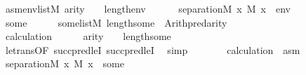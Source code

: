 \begin{isabellebody}
\ asm{\isacharcolon}{\kern0pt}{\isachardoublequoteopen}{\isasymforall}env{\isasymin}list{\isacharparenleft}{\kern0pt}M{\isacharparenright}{\kern0pt}{\isachardot}{\kern0pt}\ arity{\isacharparenleft}{\kern0pt}{\isasymphi}{\isacharparenright}{\kern0pt}\ {\isasymle}\ {}\ {\isacharhash}{\kern0pt}{\isacharplus}{\kern0pt}\ length{\isacharparenleft}{\kern0pt}env{\isacharparenright}{\kern0pt}\ {\isasymlongrightarrow}\ \isanewline
\ \ \ \ separation{\isacharparenleft}{\kern0pt}{\isacharhash}{\kern0pt}{\isacharhash}{\kern0pt}M{\isacharcomma}{\kern0pt}\ {\isasymlambda}x{\isachardot}{\kern0pt}\ M{\isacharcomma}{\kern0pt}\ {\isacharbrackleft}{\kern0pt}x{\isacharbrackright}{\kern0pt}\ {\isacharat}{\kern0pt}\ env\ {\isasymTurnstile}\ {\isasymphi}{\isacharparenright}{\kern0pt}{\isachardoublequoteclose}\isanewline
\ \ \isacommand{{\isacharbraceleft}{\kern0pt}}\isamarkupfalse%
\isanewline
\ \ \ \ \isamarkupfalse%
\ some\isanewline
\ \ \ \ \isamarkupfalse%
\ {\isachardoublequoteopen}some{\isasymin}list{\isacharparenleft}{\kern0pt}M{\isacharparenright}{\kern0pt}{\isachardoublequoteclose}\ {\isachardoublequoteopen}length{\isacharparenleft}{\kern0pt}some{\isacharparenright}{\kern0pt}\ {\isacharequal}{\kern0pt}\ Arith{\isachardot}{\kern0pt}pred{\isacharparenleft}{\kern0pt}arity{\isacharparenleft}{\kern0pt}{\isasymphi}{\isacharparenright}{\kern0pt}{\isacharparenright}{\kern0pt}{\isachardoublequoteclose}\isanewline
\ \ \ \ \isamarkupfalse%
\isanewline
\ \ \ \ \isamarkupfalse%
\ {\isacartoucheopen}{\isasymphi}{\isasymin}{\isacharunderscore}{\kern0pt}{\isacartoucheclose}\isanewline
\ \ \ \ \isamarkupfalse%
\ \isamarkupfalse%
\ calculation\isanewline
\ \ \ \ \isamarkupfalse%
\ {\isachardoublequoteopen}arity{\isacharparenleft}{\kern0pt}{\isasymphi}{\isacharparenright}{\kern0pt}\ {\isasymle}\ {}\ {\isacharhash}{\kern0pt}{\isacharplus}{\kern0pt}\ length{\isacharparenleft}{\kern0pt}some{\isacharparenright}{\kern0pt}{\isachardoublequoteclose}\ \isanewline
\ \ \ \ \ \ \isamarkupfalse%
\ le{\isacharunderscore}{\kern0pt}trans{\isacharbrackleft}{\kern0pt}OF\ succpred{\isacharunderscore}{\kern0pt}leI{\isacharbrackright}{\kern0pt}\ succpred{\isacharunderscore}{\kern0pt}leI\ \isamarkupfalse%
\ simp\isanewline
\ \ \ \ \isamarkupfalse%
\ \isamarkupfalse%
\ calculation\ \ asm\isanewline
\ \ \ \ \isamarkupfalse%
\ {\isachardoublequoteopen}separation{\isacharparenleft}{\kern0pt}{\isacharhash}{\kern0pt}{\isacharhash}{\kern0pt}M{\isacharcomma}{\kern0pt}\ {\isasymlambda}x{\isachardot}{\kern0pt}\ M{\isacharcomma}{\kern0pt}\ {\isacharbrackleft}{\kern0pt}x{\isacharbrackright}{\kern0pt}\ {\isacharat}{\kern0pt}\ some\ {\isasymTurnstile}\ {\isasymphi}{\isacharparenright}{\kern0pt}{\isachardoublequoteclose}\ \isamarkupfalse%

\end{isabellebody}
